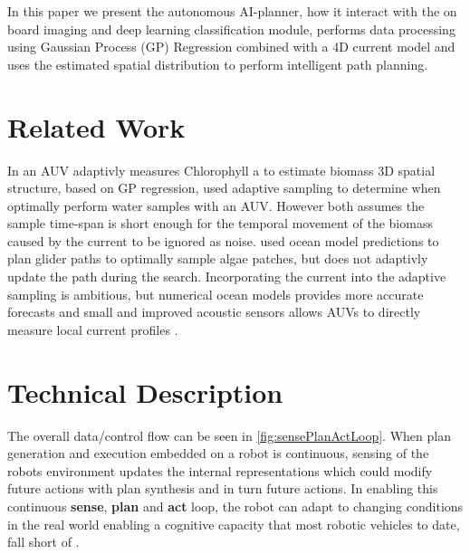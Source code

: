 \documentclass[conference]{IEEEtran}
\begin{document}
In this paper we present the autonomous AI-planner, how it interact with the on board imaging and deep learning classification module, performs data processing using Gaussian Process (GP) Regression combined with a 4D current model and uses the estimated spatial distribution to perform intelligent path planning.


\section{Related Work}

In \cite{fossum18b} an AUV adaptivly measures Chlorophyll a to estimate biomass 3D spatial structure, based on GP regression, \cite{das15} used adaptive sampling to determine when optimally perform water samples with an AUV.
However both assumes the sample time-span is short enough for the temporal movement of the biomass caused by the current to be ignored as noise.
\cite{smith10} used ocean model predictions to plan glider paths to optimally sample algae patches, but does not adaptivly update the path during the search.
Incorporating the current into the adaptive sampling is
ambitious, but numerical ocean models provides more accurate forecasts
and small and improved acoustic sensors allows AUVs to directly
measure local current profiles \cite{Fong2006, Cusi2017}.

\section{Technical Description}

The overall data/control flow can be seen in \cref{fig:sensePlanActLoop}.
When plan generation and execution embedded on a robot is continuous, sensing of the robots environment updates the internal representations which could modify future actions with plan synthesis and in turn future actions.
In enabling this continuous \textbf{sense},
\textbf{plan} and \textbf{act} loop, the robot can adapt to changing
conditions in the real world enabling a cognitive capacity that most
robotic vehicles to date, fall short of \cite{rajan12}.
\end{document}

